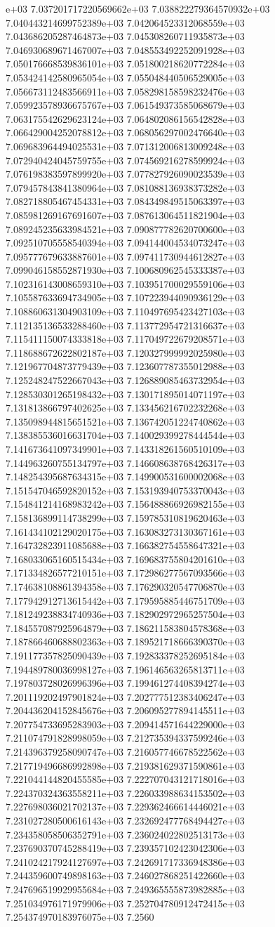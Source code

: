 e+03	7.037201717220569662e+03	7.038822279364570932e+03	7.040443214699752389e+03	7.042064523312068559e+03	7.043686205287464873e+03	7.045308260711935873e+03	7.046930689671467007e+03	7.048553492252091928e+03	7.050176668539836101e+03	7.051800218620772284e+03	7.053424142580965054e+03	7.055048440506529005e+03	7.056673112483566911e+03	7.058298158598232476e+03	7.059923578936675767e+03	7.061549373585068679e+03	7.063175542629623124e+03	7.064802086156542828e+03	7.066429004252078812e+03	7.068056297002476640e+03	7.069683964494025531e+03	7.071312006813009248e+03	7.072940424045759755e+03	7.074569216278599924e+03	7.076198383597899920e+03	7.077827926090023539e+03	7.079457843841380964e+03	7.081088136938373282e+03	7.082718805467454331e+03	7.084349849515063397e+03	7.085981269167691607e+03	7.087613064511821904e+03	7.089245235633984521e+03	7.090877782620700600e+03	7.092510705558540394e+03	7.094144004534073247e+03	7.095777679633887601e+03	7.097411730944612827e+03	7.099046158552871930e+03	7.100680962545333387e+03	7.102316143008659310e+03	7.103951700029559106e+03	7.105587633694734905e+03	7.107223944090936129e+03	7.108860631304903109e+03	7.110497695423427103e+03	7.112135136533288460e+03	7.113772954721316637e+03	7.115411150074333818e+03	7.117049722679208571e+03	7.118688672622802187e+03	7.120327999992025980e+03	7.121967704873779439e+03	7.123607787355012988e+03	7.125248247522667043e+03	7.126889085463732954e+03	7.128530301265198432e+03	7.130171895014071197e+03	7.131813866797402625e+03	7.133456216702232268e+03	7.135098944815651521e+03	7.136742051224740862e+03	7.138385536016631704e+03	7.140029399278444544e+03	7.141673641097349901e+03	7.143318261560510109e+03	7.144963260755134797e+03	7.146608638768426317e+03	7.148254395687634315e+03	7.149900531600002068e+03	7.151547046592820152e+03	7.153193940753370043e+03	7.154841214168983242e+03	7.156488866926982155e+03	7.158136899114738299e+03	7.159785310819620463e+03	7.161434102129020175e+03	7.163083273130367161e+03	7.164732823911085688e+03	7.166382754558647321e+03	7.168033065160515434e+03	7.169683755804201610e+03	7.171334826577210151e+03	7.172986277567093566e+03	7.174638108861394358e+03	7.176290320547706870e+03	7.177942912713615442e+03	7.179595885446751709e+03	7.181249238834740936e+03	7.182902972965257504e+03	7.184557087925964879e+03	7.186211583804578368e+03	7.187866460688802363e+03	7.189521718666390370e+03	7.191177357825090439e+03	7.192833378252695184e+03	7.194489780036998127e+03	7.196146563265813711e+03	7.197803728026996396e+03	7.199461274408394274e+03	7.201119202497901824e+03	7.202777512383406247e+03	7.204436204152845676e+03	7.206095277894145511e+03	7.207754733695283903e+03	7.209414571644229000e+03	7.211074791828998059e+03	7.212735394337599246e+03	7.214396379258090747e+03	7.216057746678522562e+03	7.217719496686992898e+03	7.219381629371590861e+03	7.221044144820455585e+03	7.222707043121718016e+03	7.224370324363558211e+03	7.226033988634153502e+03	7.227698036021702137e+03	7.229362466614446021e+03	7.231027280500616143e+03	7.232692477768494427e+03	7.234358058506352791e+03	7.236024022802513173e+03	7.237690370745288419e+03	7.239357102423042306e+03	7.241024217924127697e+03	7.242691717336948386e+03	7.244359600749898163e+03	7.246027868251422660e+03	7.247696519929955684e+03	7.249365555873982885e+03	7.251034976171979906e+03	7.252704780912472415e+03	7.254374970183976075e+03	7.2560